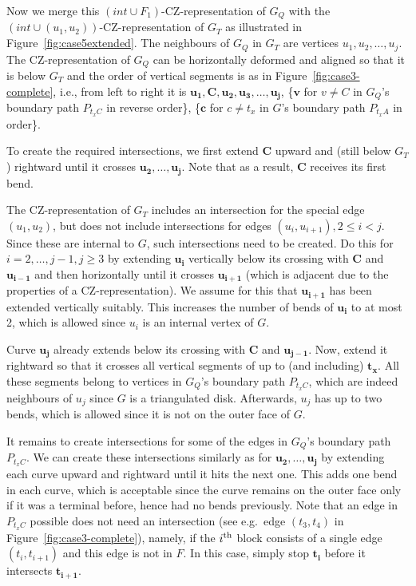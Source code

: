 \documentclass{article}
\renewcommand{\int}[1]{$(\mathit{int}\cup{#1})$}
\newcommand{\bb}[1]{\ensuremath{\mathbf{#1}}}
\begin{document}
Now we merge this \int{F_1}-CZ-representation of $G_Q$ with the 
\int{(u_1,u_2)}-CZ-representation of $G_T$ as illustrated in
Figure~\ref{fig:case5extended}.
The neighbours of $G_Q$ in $G_T$ are vertices $u_1, u_2, \ldots, u_j$. 
The CZ-representation of $G_Q$ can be horizontally deformed and aligned so that 
it is below $G_T$ and the order of vertical segments is as in 
Figure~\ref{fig:case3-complete},
i.e., from left to right it is $\bb{u_1}, \bb{C}, \bb{u_2}, \bb{u_3}, \ldots, \bb{u_j}$, 
\{\bb{v} for $v\neq C$ in $G_Q$'s boundary path
$P_{t_xC}$ in reverse  order\},
\{\bb{c} for $c\neq t_x$ in $G$'s boundary path
$P_{t_xA}$ in order\}.

To create the required intersections, we first
extend $\bb{C}$ upward and (still below $G_T$) rightward until it crosses $\bb{u_2}, \ldots, \bb{u_j}$.
Note that as a result, $\bb{C}$ receives its first bend.

The CZ-representation of $G_T$ includes an intersection for the special
edge $(u_1,u_2)$, but does not include intersections for edges 
$({u_i},{u_{i+1}}), 2 \leq i < j$.
Since these are internal to $G$, such intersections need to be created. Do this for $i = 2,\ldots,j-1, j \geq 3$
by extending $\bb{u_i}$ vertically below its crossing with $\bb{C}$ and $\bb{u_{i-1}}$ and then horizontally
until it crosses $\bb{u_{i+1}}$ (which is adjacent due to the properties of a CZ-representation).
We assume for this that $\bb{u_{i+1}}$ has been extended vertically suitably. 
This increases the number of bends of $\bb{u_i}$ to at most 2, which is allowed
since $u_i$ is an internal vertex of $G$.

Curve $\bb{u_j}$ already extends below its crossing with $\bb{C}$ and
$\bb{u_{j-1}}$. Now, extend
it rightward so that it crosses all vertical segments of up to (and including) $\bb{t_x}$.
All these segments belong to vertices in $G_Q$'s boundary path $P_{t_xC }$,
which are indeed neighbours  of $u_j$ since $G$ is a triangulated disk.
Afterwards, $u_j$ has up to two bends, which is allowed since
it is not on the outer face of $G$.

It remains to create intersections for some of the edges in $G_Q$'s boundary
path $P_{t_x C}$.
We can create these intersections similarly as for $\bb{u_2}, \ldots, \bb{u_j}$
by extending each curve upward and rightward until it hits the next one.
This adds one bend in each curve, which is acceptable since the curve 
remains on the outer face only if it was a terminal before, hence had no bends 
previously.   Note that an edge in $P_{t_x C}$
possible does not need an intersection (see e.g.~edge $(t_3,t_4)$ in 
Figure~\ref{fig:case3-complete}), namely, if the $i^{\mbox{\scriptsize{th}}}$ block consists of
a single edge $(t_i,t_{i+1})$ and this edge is not in $F$.  In this case,
simply stop $\bb{t_i}$ before it intersects $\bb{t_{i+1}}$.
\end{document}

